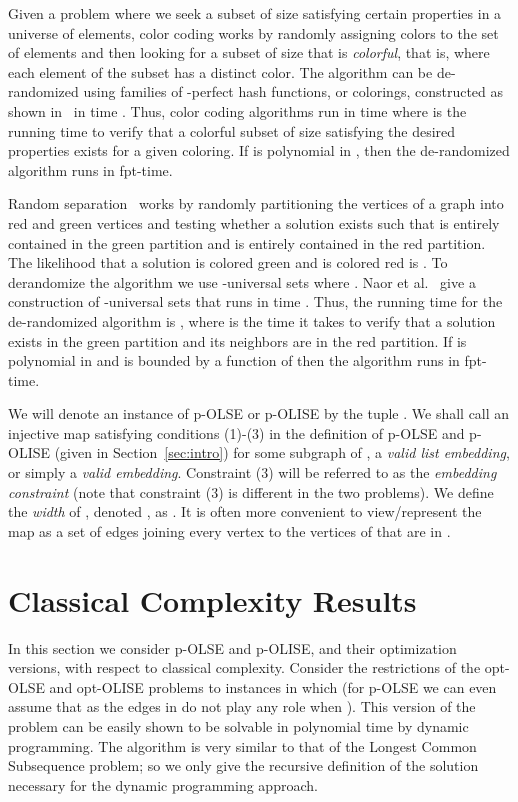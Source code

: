 \documentclass[11pt]{article}
\begin{document}
Given a problem where we seek a subset of size  satisfying certain properties in a universe of  elements, color coding works by randomly assigning  colors to the set of  elements and then looking for a subset of size  that is {\em colorful}, that is, where each element of the subset has a distinct color.  The algorithm can be de-randomized using families of -perfect hash functions, or colorings, constructed as shown in~\cite{alon95} in time . Thus, color coding algorithms run in time  where  is the running time to verify that a colorful subset of size  satisfying the desired properties exists for a given coloring.  If  is polynomial in , then the de-randomized algorithm runs in fpt-time.

Random separation~\cite{cai} works by randomly partitioning the vertices of a graph  into red and green vertices and testing whether a solution  exists such that  is entirely contained in the green partition and  is entirely contained in the red partition.  The likelihood that a solution  is colored green and  is colored red is .  To derandomize the algorithm we use -universal sets where .  Naor et al.~\cite{naor} give a construction of -universal sets that runs in time .  Thus, the running time for the de-randomized algorithm is , where  is the time it takes to verify that a solution exists in the green partition and its neighbors are in the red partition.  If  is polynomial in  and  is bounded by a function of  then the algorithm runs in fpt-time.

We will denote an instance of p-OLSE or p-OLISE by the tuple . We shall call an injective map  satisfying conditions (1)-(3) in the definition of p-OLSE and p-OLISE (given in Section~\ref{sec:intro}) for some subgraph  of , a {\em valid list embedding}, or simply a {\em valid embedding}. Constraint (3) will be referred to as the {\em embedding constraint} (note that constraint (3) is different in the two problems). We define the {\em width} of , denoted , as . It is often more convenient to view/represent the map  as a set of edges joining every vertex  to the vertices of  that are in .

\section{Classical Complexity Results}\label{sec:complexity}
In this section we consider p-OLSE and p-OLISE, and their optimization versions, with respect to classical complexity. Consider the restrictions of the opt-OLSE and opt-OLISE problems to instances in which  (for p-OLSE we can even assume that  as the edges in  do not play any role when ). This version of the problem can be easily shown to be solvable in polynomial time by dynamic programming. The algorithm is very similar to that of the {\sc Longest Common Subsequence} problem; so we only give the recursive definition of the solution necessary for the dynamic programming approach.
\end{document}
